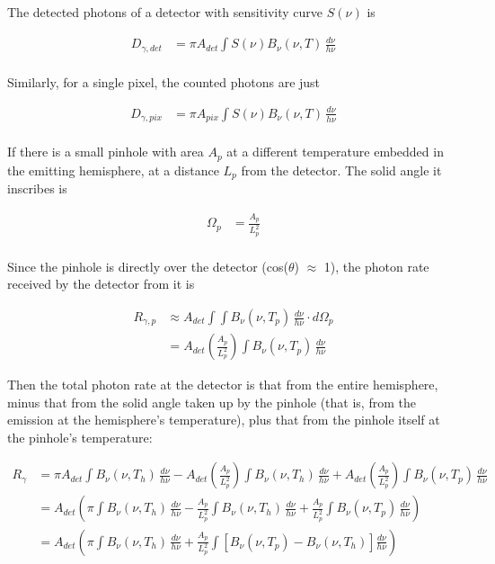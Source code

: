\documentclass[11pt]{article}
\begin{document}
The detected photons of a detector with sensitivity curve $S(\nu)$ is

\begin{align}
    D_{\gamma,det} &= \pi A_{det} \int S(\nu) B_{\nu}(\nu, T) \, \frac{d\nu}{h\nu}  \\
\end{align}

Similarly, for a single pixel, the counted photons are just

\begin{align}
    D_{\gamma,pix} &= \pi A_{pix} \int S(\nu) B_{\nu}(\nu, T) \, \frac{d\nu}{h\nu}  \\
\end{align}

If there is a small pinhole with area $A_{p}$ at a different temperature embedded in the emitting hemisphere, at a distance $L_{p}$ from the detector. The solid angle it inscribes is 

\begin{align}
    \Omega_{p} &= \frac{A_{p}}{L_{p}^2} \\
\end{align}

Since the pinhole is directly over the detector (cos($\theta$) $\approx$ 1), the photon rate received by the detector from it is

\begin{align}
    R_{\gamma,p} &\approx A_{det} \int \int B_{\nu}(\nu, T_p) \, \frac{d\nu}{h\nu} \cdot d\Omega_p \\
    &= A_{det} \left(\frac{A_p}{L_p^2}\right) \int B_{\nu}(\nu, T_p) \, \frac{d\nu}{h\nu}
\end{align}

Then the total photon rate at the detector is that from the entire hemisphere, minus that from the solid angle taken up by the pinhole (that is, from the emission at the hemisphere's temperature), plus that from the pinhole itself at the pinhole's temperature:

\begin{align}
    R_{\gamma} &= \pi A_{det} \int B_{\nu}(\nu, T_{h}) \, \frac{d\nu}{h\nu} - A_{det} \left(\frac{A_p}{L_p^2}\right) \int B_{\nu}(\nu, T_{h}) \, \frac{d\nu}{h\nu} + A_{det} \left(\frac{A_p}{L_p^2}\right) \int B_{\nu}(\nu, T_p) \, \frac{d\nu}{h\nu} \\
    &= A_{det} \left( \pi \int B_{\nu}(\nu, T_{h}) \, \frac{d\nu}{h\nu} - \frac{A_p}{L_p^2} \int B_{\nu}(\nu, T_{h}) \, \frac{d\nu}{h\nu} + \frac{A_p}{L_p^2} \int B_{\nu}(\nu, T_p) \, \frac{d\nu}{h\nu} \right) \\
    &= A_{det} \left( \pi \int B_{\nu}(\nu, T_{h}) \, \frac{d\nu}{h\nu} + \frac{A_p}{L_p^2} \int \left[ B_{\nu}(\nu, T_{p}) - B_{\nu}(\nu, T_{h}) \right] \frac{d\nu}{h\nu} \right) \\
\end{align}
\end{document}
